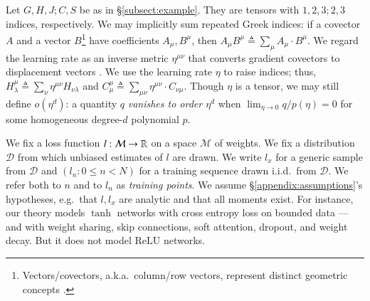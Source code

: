 \documentclass{article}
\theoremstyle{plain}
\theoremstyle{definition}
\newcommand{\Dd}{\mathcal{D}}
\newcommand{\Mm}{\mathcal{M}}
\begin{document}

        Let $G, H, J; C, S$ be as in \S \ref{subsect:example}.  They are
        tensors with $1, 2, 3; 2, 3$ indices, respectively.
        We may implicitly sum repeated Greek indices: if a covector $A$
        and a vector $B$\footnote{
            Vectors/covectors, a.k.a.\ column/row vectors,
            represent distinct geometric concepts \citep{ko93}. 
        } have coefficients $A_\mu, B^\mu$, then 
        $
            A_\mu B^\mu
            \triangleq
            \sum_\mu A_\mu \cdot B^\mu
        $.
        We regard the learning rate as an
        inverse metric $\eta^{\mu\nu}$ that converts gradient covectors to
        displacement vectors \citep{bo13}.  We use the learning rate
        $\eta$ to raise indices; thus,
        $
            H^{\mu}_{\lambda}
            \triangleq
            \sum_{\nu} 
            \eta^{\mu\nu} H_{\nu\lambda}
        $ and
        $
            C^{\mu}_{\mu}
            \triangleq
            \sum_{\mu \nu} \eta^{\mu\nu} \cdot C_{\nu\mu}
        $.
        Though $\eta$ is a tensor, we may still define $o(\eta^d)$: a quantity
        $q$ \emph{vanishes to order $\eta^d$} when $\lim_{\eta\to 0} q/p(\eta)
        = 0$ for some homogeneous degree-$d$ polynomial $p$.




        We fix a loss function $l:\Mm\to\RR$ on a space $\Mm$ of weights.  We
        fix a distribution $\Dd$ from which unbiased estimates of $l$ are
        drawn.  We write $l_x$ for a generic sample from $\Dd$ and $(l_n: 0\leq
        n<N)$ for a training sequence drawn i.i.d.\ from $\Dd$.  We refer both
        to $n$ and to $l_n$ as \emph{training points}.  We assume
        \S\ref{appendix:assumptions}'s hypotheses, e.g.\ that $l, l_x$ are
        analytic and that all moments exist.
        For instance, our theory models $\tanh$ networks with cross entropy
        loss on bounded data --- and with weight sharing, skip connections,
        soft attention, dropout, and weight decay.  But it does not model
        $\text{ReLU}$ networks.
        
\end{document}
